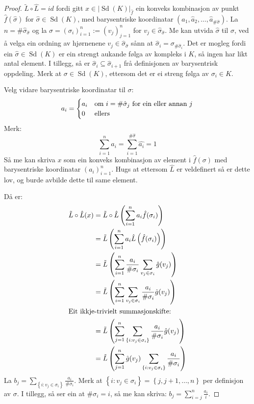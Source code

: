 \documentclass[a4paper, titlepage, 12pt, norsk]{article}
\theoremstyle{plain}
\theoremstyle{definition}
\newcommand{\gr}[1]{ \lvert #1 \rvert } %
\newcommand{\set}[1]{ \left \{ #1 \right \} } %
\newcommand{\tuple}[1]{ \left( #1 \right) } %
\DeclareMathOperator{\Sd}{Sd}
\begin{document}
\begin{proof}
	\( \tilde{L}\circ\hat{L} = id \) fordi gitt \( x \in \gr{\Sd(K)}_{\hat{f}} \) ein konveks kombinasjon av punkt \( \hat{f}(\hat{\sigma}) \) for \( \hat{\sigma} \in \Sd(K) \), med barysentriske koordinatar \( \tuple{\hat{a}_1, \hat{a}_2, \dots, \hat{a}_{\#\hat{\sigma}}} \). La \( n = \#\hat{\sigma}_{\hat{\sigma}} \) og la \( \sigma = \tuple{\sigma_i}_{i=1}^{n} := \tuple{v_j}_{j=1}^{n} \) for \( v_j \in \hat{\sigma}_{\hat{\sigma}} \). Me kan utvida \( \hat{\sigma} \) til \( \sigma \), ved å velga ein ordning av hjørnenene \( v_j \in \hat{\sigma}_{\hat{\sigma}} \) sånn at \( \hat{\sigma}_i = \sigma_{\#\hat{\sigma}_i} \). Det er mogleg fordi ein \( \hat{\sigma} \in \Sd(K) \) er ein strengt aukande følga av kompleks i \( K \), så ingen har likt antal element. I tillegg, så er \( \hat{\sigma}_i \subseteq \hat{\sigma}_{i+1} \) frå definisjonen av barysentrisk oppdeling. Merk at \( \sigma \in \Sd(K) \), ettersom det er ei streng følga av \( \sigma_i \in K \).

	Velg vidare barysentriske koordinatar til \( \sigma \):
	\[
		a_i =
		\begin{cases}
			a_i & \text{om \( i = \#\hat{\sigma}_j \) for ein eller annan \( j \)} \\
			0 & \text{ellers}
		\end{cases}
	\]
	Merk:
	\[
		\sum_{i=1}^n a_i = \sum_{i=1}^{\#\hat{\sigma}}\hat{a_i}=1
	\]
	Så me kan skriva \( x \) som ein konveks kombinasjon av element i \( \hat{f}(\sigma) \) med barysentriske koordinatar \( \tuple{a_i}_{i=1}^n \). Hugs at ettersom \( \hat{L} \) er veldefinert så er dette lov, og burde avbilde dette til same element.

	Då er:
	\begin{align*}
		\tilde{L}\circ\hat{L}(x) &= \tilde{L}\circ\hat{L}\tuple{\sum_{i=1}^n a_i \hat{f}(\sigma_i)} \\
		&= \tilde{L}\tuple{\sum_{i=1}^n a_i \hat{L}\tuple{\hat{f}(\sigma_i)}} \\
		&= \tilde{L}\tuple{\sum_{i=1}^n \frac{a_i}{\#\sigma_i}\sum_{v_j \in \sigma_i}\hat{g}(v_j)} \\
		&= \tilde{L}\tuple{\sum_{i=1}^n\sum_{v_j \in \sigma_i}\frac{a_i}{\#\sigma_i}\hat{g}(v_j)} \\
		\intertext{Eit ikkje-trivielt summasjonskifte:}
		&= \tilde{L}\tuple{\sum_{j=1}^n\sum_{\set{i:v_j\in\sigma_i}}\frac{a_i}{\#\sigma_i}\hat{g}(v_j)} \\
		&= \tilde{L}\tuple{\sum_{j=1}^n \hat{g}(v_j) \sum_{\set{i:v_j\in\sigma_i}}\frac{a_i}{\#\sigma_i}}
	\end{align*}
	La \( b_j = \sum_{\set{i:v_j\in\sigma_i}}\frac{a_i}{\#\sigma_i} \). Merk at \( \set{i : v_j \in \sigma_i} = \set{j, j+1, \dots, n } \) per definisjon av \( \sigma \). I tillegg, så ser ein at \( \#\sigma_i = i \), så me kan skriva: \( b_j = \sum_{i=j}^n \frac{a_i}{i} \).


\end{proof}
\end{document}
